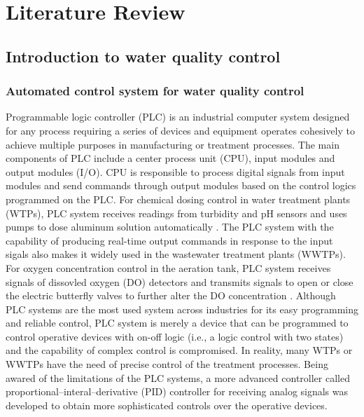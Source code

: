 \chapter{Literature Review}
\section{Introduction to water quality control}
\subsection{Automated control system for water quality control}
Programmable logic controller (PLC) is an industrial computer system designed for any process requiring a series of devices and equipment operates cohesively to achieve multiple purposes in manufacturing or treatment processes. The main components of PLC include a center process unit (CPU), input modules and output modules (I/O). CPU is responsible to process digital signals from input modules and send commands through output modules based on the control logics programmed on the PLC. For chemical dosing control in water treatment plants (WTPs), PLC system receives readings from turbidity and pH sensors and uses pumps to dose aluminum solution automatically \citep{andhareSCADAToolIncrease2014}. The PLC system with the capability of producing real-time output commands in response to the input sigals also makes it widely used in the wastewater treatment plants (WWTPs). For oxygen concentration control in the aeration tank, PLC system receives signals of dissovled oxygen (DO) detectors and transmits signals to open or close the electric butterfly valves to further alter the DO concentration \citep{zhuApplicationPLCSewage2017}. Although PLC systems are the most used system across industries for its easy programming and reliable control, PLC system is merely a device that can be programmed to control operative devices with on-off logic (i.e., a logic control with two states) and the capability of complex control is compromised. In reality, many WTPs or WWTPs have the need of precise control of the treatment processes. Being awared of the limitations of the PLC systems, a more advanced controller called proportional–interal–derivative (PID) controller for receiving analog signals was developed to obtain more sophisticated controls over the operative devices.

